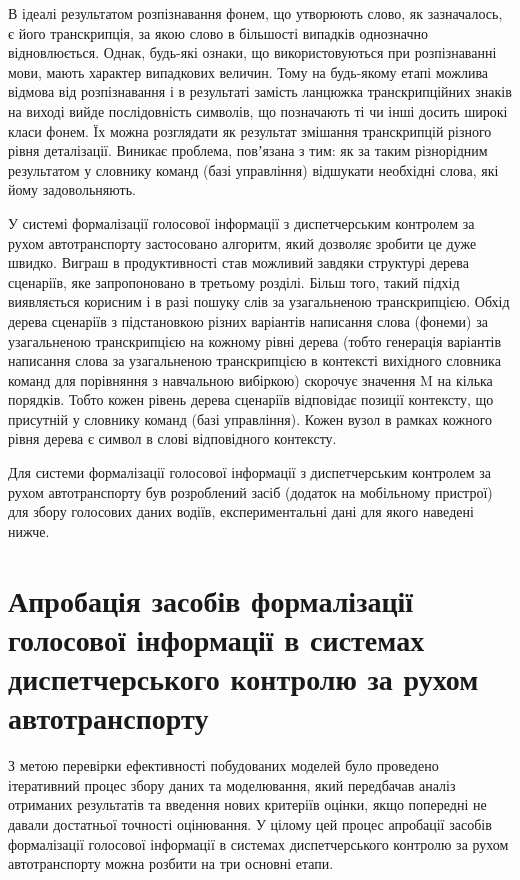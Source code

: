 В ідеалі результатом розпізнавання фонем, що утворюють слово, як зазначалось, є його транскрипція, за якою слово в більшості випадків однозначно відновлюється. Однак, будь-які ознаки, що використовуються при розпізнаванні мови, мають характер випадкових величин. Тому на будь-якому етапі можлива відмова від розпізнавання і в результаті замість ланцюжка транскрипційних знаків на виході вийде послідовність символів, що позначають ті чи інші досить широкі класи фонем. Їх можна розглядати як результат змішання транскрипцій різного рівня деталізації. Виникає проблема, повʼязана з тим: як за таким різнорідним результатом у словнику команд (базі управління) відшукати необхідні слова, які йому задовольняють. 

У системі формалізації голосової інформації з диспетчерським контролем за рухом автотранспорту застосовано алгоритм, який дозволяє зробити це дуже швидко. Виграш в продуктивності став можливий завдяки структурі дерева сценаріїв, яке запропоновано в третьому розділі. Більш того, такий підхід виявляється корисним і в разі пошуку слів за узагальненою транскрипцією. Обхід дерева сценаріїв з підстановкою різних варіантів написання слова (фонеми) за узагальненою транскрипцією на кожному рівні дерева (тобто генерація варіантів написання слова за узагальненою транскрипцією в контексті вихідного словника команд для порівняння з навчальною вибіркою) скорочує значення M на кілька порядків.
Тобто кожен рівень дерева сценаріїв відповідає позиції контексту, що присутній у словнику команд (базі управління). Кожен вузол в рамках кожного рівня дерева є символ в слові відповідного контексту.

Для системи формалізації голосової інформації з диспетчерським контролем за рухом автотранспорту був розроблений засіб (додаток на мобільному пристрої) для збору голосових даних водіїв, експериментальні дані для якого наведені нижче.

\section{Апробація засобів формалізації голосової інформації в системах диспетчерського контролю за рухом автотранспорту} \label{sect4_2}

З метою перевірки ефективності побудованих моделей було проведено ітеративний процес збору даних та моделювання, який передбачав аналіз отриманих результатів та введення нових критеріїв оцінки, якщо попередні не давали достатньої точності оцінювання. У цілому цей процес апробації засобів формалізації голосової інформації в системах диспетчерського контролю за рухом автотранспорту можна розбити на три основні етапи.

